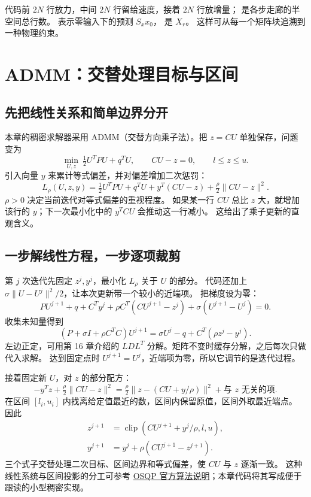 \par\noindent\begin{minipage}{\linewidth}

\end{minipage}\par
代码前 $2N$ 行放力，中间 $2N$ 行留给速度，接着 $2N$ 行放增量； 是各步走廊的半空间总行数。
 表示零输入下的预测 $S_xx_0$， 是 $X_r$。
这样可从每一个矩阵块追溯到一种物理约束。

\section{ADMM：交替处理目标与区间}
\subsection{先把线性关系和简单边界分开}
本章的稠密求解器采用 ADMM（交替方向乘子法）。把 $z=CU$ 单独保存，问题变为
\[
 \min_{U,z}\ \tfrac12U^TPU+q^TU,\qquad CU-z=0,\qquad l\leq z\leq u.
\]
引入向量 $y$ 来累计等式偏差，并对偏差增加二次惩罚：
\[
 L_\rho(U,z,y)=\tfrac12U^TPU+q^TU+y^T(CU-z)+\tfrac\rho2\|CU-z\|^2.
\]
$\rho>0$ 决定当前迭代对等式偏差的重视程度。
如果某一行 $CU$ 总比 $z$ 大，就增加该行的 $y$；下一次最小化中的 $y^TCU$ 会推动这一行减小。
这给出了乘子更新的直观含义。

\subsection{一步解线性方程，一步逐项裁剪}
第 $j$ 次迭代先固定 $z^j,y^j$，最小化 $L_\rho$ 关于 $U$ 的部分。
代码还加上 $\sigma\|U-U^j\|^2/2$，让本次更新带一个较小的近端项。
把梯度设为零：
\[
 PU^{j+1}+q+C^Ty^j+\rho C^T(CU^{j+1}-z^j)+\sigma(U^{j+1}-U^j)=0.
\]
收集未知量得到
\begin{equation}
 (P+\sigma I+\rho C^TC)U^{j+1}
 =\sigma U^j-q+C^T(\rho z^j-y^j).\label{eq:admmu}
\end{equation}
左边正定，可用第 16 章介绍的 $LDL^T$ 分解。矩阵不变时缓存分解，之后每次只做代入求解。
达到固定点时 $U^{j+1}=U^j$，近端项为零，所以它调节的是迭代过程。

接着固定新 $U$，对 $z$ 的部分配方：
\[
 -y^Tz+\tfrac\rho2\|CU-z\|^2
 =\tfrac\rho2\|z-(CU+y/\rho)\|^2+\text{与 $z$ 无关的项}.
\]
在区间 $[l_i,u_i]$ 内找离给定值最近的数，区间内保留原值，区间外取最近端点。
因此
\begin{align}
 z^{j+1}&=\operatorname{clip}(CU^{j+1}+y^j/\rho,l,u),\label{eq:admmz}\\
 y^{j+1}&=y^j+\rho(CU^{j+1}-z^{j+1}).\label{eq:admmy}
\end{align}
三个式子交替处理二次目标、区间边界和等式偏差，使 $CU$ 与 $z$ 逐渐一致。
这种线性系统与区间投影的分工可参考
\href{https://osqp.org/docs/solver/index.html}{OSQP 官方算法说明}；本章代码将其写成便于跟读的小型稠密实现。

